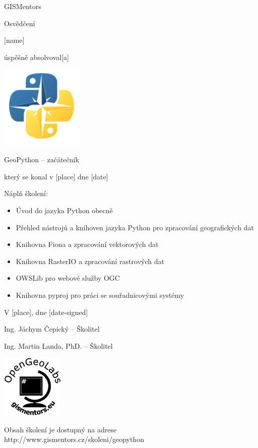 \documentclass[12pt, a4paper]{letter}
\begin{document}
\pagestyle{empty}
\begin{center}

{\Large GISMentors}

{\Huge Osvědčení}

{\Large [name]}

úspěšně absolvoval[a]

\includegraphics[width=0.30\textwidth]{../images/geopython.png}

{\Large GeoPython -- začátečník}

který se konal v [place] dne [date]
\end{center}

Náplň školení:

\begin{itemize}
    \item Úvod do jazyka Python obecně
    \item Přehled nástrojů a knihoven jazyka Python pro zpracování geografických dat
    \item Knihovna Fiona a zpracování vektorových dat
    \item Knihovna RasterIO a zpracování rastrových dat
    \item OWSLib pro webové služby OGC
    \item Knihovna pyproj pro práci se souřadnicovými systémy
\end{itemize}

\vfill
\parbox{7cm}{

    V [place], dne [date-signed]\\

\vfill

    Ing. Jáchym Čepický -- Školitel \\

\vfill

    Ing. Martin Landa, PhD. -- Školitel
}
\hfill
\parbox{3cm}{
    \includegraphics[width=3cm]{../images/placka.eps}
}

\vfill

\begin{center}
{\footnotesize Obsah školení je dostupný na adrese
http://www.gismentors.cz/skoleni/geopython}
\end{center}
\end{document}
